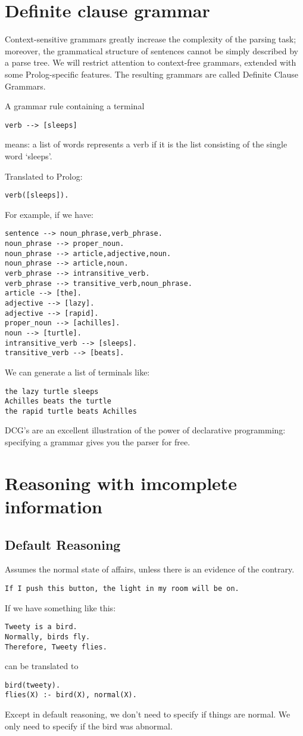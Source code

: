 \documentclass[12pt, oneside]{report}
\numberwithin{definition}{chapter}
\numberwithin{theorem}{chapter}
\numberwithin{lemma}{chapter}
\numberwithin{Rule}{chapter}
\numberwithin{equation}{chapter}
\begin{document}
\section{Definite clause grammar}
Context-sensitive grammars greatly increase the complexity of the parsing task; moreover, the grammatical structure of sentences cannot be simply described by a parse tree. We will restrict attention to context-free grammars, extended with some Prolog-specific features. The resulting grammars are called Definite Clause Grammars.

A grammar rule containing a terminal
\begin{verbatim}
verb --> [sleeps]
\end{verbatim}
means: a list of words represents a verb if it is the list consisting of the single word ‘sleeps’.

Translated to Prolog:
\begin{verbatim}
verb([sleeps]).
\end{verbatim}

For example, if we have: 
\begin{verbatim}
sentence --> noun_phrase,verb_phrase.
noun_phrase --> proper_noun.
noun_phrase --> article,adjective,noun.
noun_phrase --> article,noun.
verb_phrase --> intransitive_verb.
verb_phrase --> transitive_verb,noun_phrase.
article --> [the].
adjective --> [lazy].
adjective --> [rapid].
proper_noun --> [achilles].
noun --> [turtle].
intransitive_verb --> [sleeps].
transitive_verb --> [beats].
\end{verbatim}
We can generate a list of terminals like:
\begin{verbatim}
the lazy turtle sleeps
Achilles beats the turtle
the rapid turtle beats Achilles
\end{verbatim}
DCG's are an excellent illustration of the power of declarative programming: specifying a grammar gives
you the parser for free.

\section{Reasoning with imcomplete information}
\subsection{Default Reasoning}
Assumes the normal state of affairs, unless there is an evidence of the contrary.
\begin{verbatim}
If I push this button, the light in my room will be on.
\end{verbatim}
If we have something like this:
\begin{verbatim}
Tweety is a bird.
Normally, birds fly.
Therefore, Tweety flies.
\end{verbatim}
can be translated to 
\begin{verbatim}
bird(tweety).
flies(X) :- bird(X), normal(X).
\end{verbatim}
Except in default reasoning, we don't need to specify if things are normal. We only need to specify if the bird was abnormal.
\end{document}
